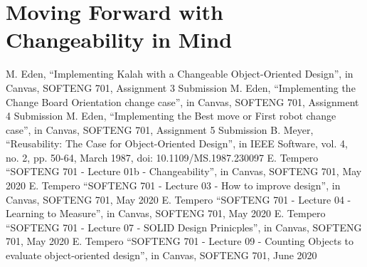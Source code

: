 \documentclass[10pt, a4paper, conference]{IEEEtran}
\begin{document}
\section{Moving Forward with Changeability in Mind}


\begin{thebibliography}{00}
   M. Eden, ``Implementing Kalah with a Changeable
    Object-Oriented Design'', in Canvas, SOFTENG 701, Assignment 3 
    Submission
   M. Eden, ``Implementing the Change Board Orientation
    change case'', in Canvas, SOFTENG 701, Assignment 4 Submission
   M. Eden, ``Implementing the Best move or First robot
    change case'', in Canvas, SOFTENG 701, Assignment 5 Submission
   B. Meyer, ``Reusability: The Case for Object-Oriented
    Design'', in IEEE Software, vol. 4, no. 2, pp. 50-64, March 1987, 
    doi: 10.1109/MS.1987.230097
   E. Tempero ``SOFTENG 701 - Lecture 01b - Changeability'',  in Canvas, SOFTENG 701, May 2020
   E. Tempero ``SOFTENG 701 - Lecture 03 - How to improve design'',  in Canvas, SOFTENG 701, May 2020
   E. Tempero ``SOFTENG 701 - Lecture 04 - Learning to Measure'',  in Canvas, SOFTENG 701, May 2020
   E. Tempero ``SOFTENG 701 - Lecture 07 - SOLID Design Prinicples'',  in Canvas, SOFTENG 701, May 2020
   E. Tempero ``SOFTENG 701 - Lecture 09 - Counting Objects to evaluate object-oriented design'',  in Canvas, SOFTENG 701, June 2020
\end{thebibliography}
\end{document}
